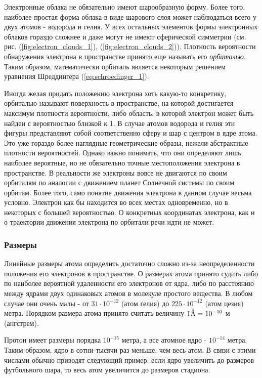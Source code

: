 Электронные облака не обязательно имеют шарообразную форму.
Более того, наиболее простая форма облака в виде шарового слоя может наблюдаться всего у двух атомов - водорода и гелия.
У всех остальных элементов формы электронных облаков гораздо сложнее и даже могут не имеют сферической симметрии (см. рис. (\ref{fig:electron_clouds_1}), (\ref{fig:electron_clouds_2})).
Плотность вероятности обнаружения электрона в пространстве принято еще называть его \textit{орбиталью}.
Таким образом, математически орбиталь является некоторым решением уравнения Шреддингера (\ref{eq:schroedinger_1}).

Иногда желая придать положению электрона хоть какую-то конкретику, орбиталью называют поверхность в пространстве, на которой достигается максимум плотности вероятности, либо область, в которой электрон может быть найден с вероятностью близкой к 1.
В случае атомов водорода и гелия эти фигуры представляют собой соответственно сферу и шар с центром в ядре атома.
Это уже гораздо более наглядные геометрические образы, нежели абстрактные плотности вероятностей.
Однако важно понимать, что они определяют лишь наиболее вероятные, но не обязательно точные местоположения электрона в пространстве. 
В реальности же электроны вовсе не двигаются по своим орбиталям по аналогии с движением планет Солнечной системы по своим орбитам.
Более того, само понятие движения электрона в данном случае весьма условно.
Электрон как бы находится во всех местах одновременно, но в некоторых с большей вероятностью. 
О конкретных координатах электрона, как и о траектории движения электрона по орбитали речи идти не может.

\subsubsection*{Размеры}

Линейные размеры атома определить достаточно сложно из-за неопределенности положения его электронов в пространстве.
О размерах атома принято судить либо по наиболее вероятной удаленности его электронов от ядра, либо по расстоянию между ядрами двух одинаковых атомов в молекуле простого вещества.
В любом случае они очень малы - от $31\cdot 10^{-12}$ (атом гелия) до $225\cdot 10^{-12}$ (атом цезия) метра.
Порядком размера атома принято считать величину $1\mbox{\normalfont\AA} = 10^{-10}$ м (ангстрем).

Протон имеет размеры порядка $10^{-15}$ метра, а все атомное ядро - $10^{-14}$ метра.
Таким образом, ядро в сотни-тысячи раз меньше, чем весь атом.
В связи с этими числами обычно приводят следующий пример: если ядро увеличить до размеров футбольного шара, то весь атом увеличится до размеров стадиона.

